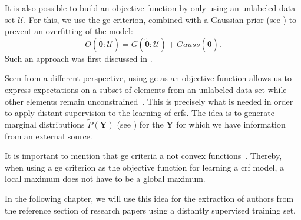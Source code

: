 It is also possible to build an \gls{objective function} by only using an unlabeled data set $\mathcal{U}$.
For this, we use the \gls{ge} criterion, combined with a Gaussian prior (see ) to prevent an overfitting of the model:
\begin{equation}
  \label{equ:objective-function-g}
  O(\bm{\tilde{\theta}}:\mathcal{U})=G(\bm{\tilde{\theta}}:\mathcal{U})+Gauss(\bm{\tilde{\theta}}).
\end{equation}
Such an approach was first discussed in \citet{mann2008generalized}.

Seen from a different perspective, using \gls{ge} as an objective function allows us to express expectations on a subset of elements from an unlabeled data set while other elements remain unconstrained~\citep{mann2010generalized}.
This is precisely what is needed in order to apply \gls{distant supervision} to the learning of \glspl{crf}.
The idea is to generate \glspl{marginal distribution} $\tilde{P}(\mathbf{Y})$ (see ) for the $\mathbf{Y}$ for which we have information from an external source.

It is important to mention that \gls{ge} criteria a not convex functions~\citep{mann2010generalized}.
Thereby, when using a \gls{ge} criterion as the objective function for learning a \gls{crf} model, a local maximum does not have to be a global maximum.

In the following chapter, we will use this idea for the extraction of authors from the reference section of research papers using a distantly supervised training set.

